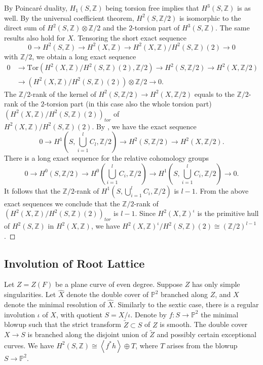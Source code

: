 \documentclass[
]{article}
\begin{document}
By Poincaré duality, \(H_1(S,\mathbb{Z})\) being torsion free implies
that \(H^3(S,\mathbb{Z})\) is as well. By the universal coefficient
theorem, \(H^2(S,\mathbb{Z}/2)\) is isomorphic to the direct sum of
\(H^2(S,\mathbb{Z})\otimes\mathbb{Z}/2\) and the \(2\)-torsion part of
\(H^3(S,\mathbb{Z})\). The same results also hold for \(X\). Tensoring
the short exact sequence
\[0\to H^2(S,\mathbb{Z})\to H^2(X,\mathbb{Z})\to H^2(X,\mathbb{Z})/H^2(S,\mathbb{Z})(2)\to 0\]
with \(\mathbb{Z}/2\), we obtain a long exact sequence \[\begin{aligned}
        0 & \to \mathrm{Tor}(H^2(X,\mathbb{Z})/H^2(S,\mathbb{Z})(2),\mathbb{Z}/2)\to H^2(S,\mathbb{Z}/2)\to H^2(X,\mathbb{Z}/2) \\
        & \to (H^2(X,\mathbb{Z})/H^2(S,\mathbb{Z})(2))\otimes \mathbb{Z}/2\to 0.
    
\end{aligned}\] The \(\mathbb{Z}/2\)-rank of the kernel of
\(H^2(S,\mathbb{Z}/2)\to H^2(X,\mathbb{Z}/2)\) equals to the
\(\mathbb{Z}/2\)-rank of the \(2\)-torsion part (in this case also the
whole torsion part) \((H^2(X,\mathbb{Z})/H^2(S,\mathbb{Z})(2))_{tor}\)
of\\
\(H^2(X,\mathbb{Z})/H^2(S,\mathbb{Z})(2)\). By
\cite[Theorem 1]{lee1995homology}, we have the exact sequence
\[0\to H^1(S,\bigcup_{i=1}^{l}C_l,\mathbb{Z}/2)\to H^2(S,\mathbb{Z}/2)\to H^2(X,\mathbb{Z}/2).\]
There is a long exact sequence for the relative cohomology groups
\[0\to H^0(S,\mathbb{Z}/2)\to H^0(\bigcup_{i=1}^{l}C_i,\mathbb{Z}/2)\to H^1(S,\bigcup_{i=1}^l C_i,\mathbb{Z}/2)\to 0.\]
It follows that the \(\mathbb{Z}/2\)-rank of
\(H^1(S,\bigcup_{i=1}^l C_i,\mathbb{Z}/2)\) is \(l-1\). From the above
exact sequences we conclude that the \(\mathbb{Z}/2\)-rank of
\((H^2(X,\mathbb{Z})/H^2(S,\mathbb{Z})(2))_{tor}\) is \(l-1\). Since
\(H^2(X,\mathbb{Z})^{\iota}\) is the primitive hull of
\(H^2(S,\mathbb{Z})\) in \(H^2(X,\mathbb{Z})\), we have
\(H^2(X,\mathbb{Z})^{\iota}/H^2(S,\mathbb{Z})(2)\cong (\mathbb{Z}/2)^{l-1}\).~◻

\subsection{Involution of Root
Lattice}\label{involution-of-root-lattice}

Let \(Z=Z(F)\) be a plane curve of even degree. Suppose \(Z\) has only
simple singularities. Let \(\widehat{X}\) denote the double cover of
\(\mathbb{P}^2\) branched along \(Z\), and \(X\) denote the minimal
resolution of \(\widehat{X}\). Similarly to the sextic case, there is a
regular involution \(\iota\) of \(X\), with quotient \(S=X/\iota\).
Denote by \(f\colon S\to \mathbb{P}^2\) the minimal blowup such that the
strict transform \(\widetilde{Z}\subset S\) of \(Z\) is smooth. The
double cover \(X\to S\) is branched along the disjoint union of
\(\widetilde{Z}\) and possibly certain exceptional curves. We have
\(H^2(S,\mathbb{Z})\cong \left\langle f^* h\right\rangle\oplus T\),
where \(T\) arises from the blowup \(S\to \mathbb{P}^2\).
\end{document}

